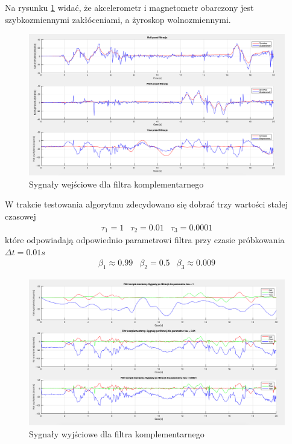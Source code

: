  Na rysunku \ref{Komplementarny przed} widać, że akcelerometr i magnetometr obarczony jest szybkozmiennymi zakłóceniami, a żyroskop wolnozmiennymi.
\begin{figure}[h!]
    \centering
    \includegraphics[width=1\textwidth]{Rysunki/Rozdzial04/Filtr_komplementarny_przed.png}
    \caption{Sygnały wejściowe dla filtra komplementarnego}
    \label{Komplementarny przed}
\end{figure}

W trakcie testowania algorytmu zdecydowano się dobrać trzy wartości stałej czasowej
$$
    \begin{array}{ccc}
        \tau_1 = 1 & \tau_2 = 0.01 & \tau_3 = 0.0001
    \end{array}
$$
które odpowiadają odpowiednio parametrowi filtra przy czasie próbkowania $\Delta t = 0.01s$
$$
    \begin{array}{ccc}
        \beta_1 \approx 0.99 & \beta_2 = 0.5 & \beta_3 \approx 0.009
    \end{array}
$$

\begin{figure}[h!]
    \centering
    \includegraphics[width=1\textwidth]{Rysunki/Rozdzial04/Filtr_komplementarny_po.png}
    \caption{Sygnały wyjściowe dla filtra komplementarnego}
    \label{Komplementarny po}
\end{figure}

